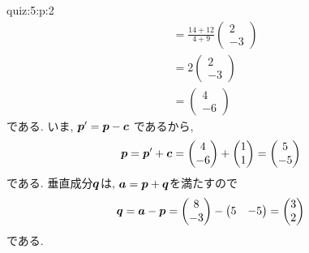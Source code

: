 \begin{answerof}{quiz:5:p:2}
\begin{align*}
  &=\frac{14+12}{4+9}\begin{pmatrix}2\\-3\end{pmatrix}\\
      &=2\begin{pmatrix}2\\-3\end{pmatrix}\\
  &=\begin{pmatrix}4\\-6\end{pmatrix}
  \end{align*}
  である.
  いま, $\boldsymbol{p}'=\boldsymbol{p}-\boldsymbol{c}$
  であるから,
  \begin{align*}
    \boldsymbol{p}=\boldsymbol{p}'+\boldsymbol{c}=\begin{pmatrix}4\\-6\end{pmatrix}+\begin{pmatrix}1\\1\end{pmatrix}=\begin{pmatrix}5\\-5\end{pmatrix}
  \end{align*}
  である.  
  垂直成分$\boldsymbol{q}$は,
  $\boldsymbol{a}=\boldsymbol{p}+\boldsymbol{q}$を満たすので
  \begin{align*}
    \boldsymbol{q}=\boldsymbol{a}-\boldsymbol{p}
    =\begin{pmatrix}8\\-3\end{pmatrix}-\begin{pmatrix}5&-5\end{pmatrix}
    =\begin{pmatrix}3\\2\end{pmatrix}
  \end{align*}
  である.



\end{answerof}

